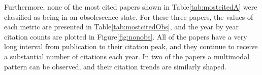 Furthermore, none of the most cited papers shown in Table\ref{tab:mostcitedA} were classified as being in an obsolescence state. For these three papers, the values of each metric are presented in Table\ref{tab:mostcitedObs}, and the year by year citation counts are plotted in Figure\ref{fig:nonobs}. All of the papers have a very long interval from publication to their citation peak, and they continue to receive a substantial number of citations each year. In two of the papers a multimodal pattern can be observed, and their citation trends are similarly shaped.

